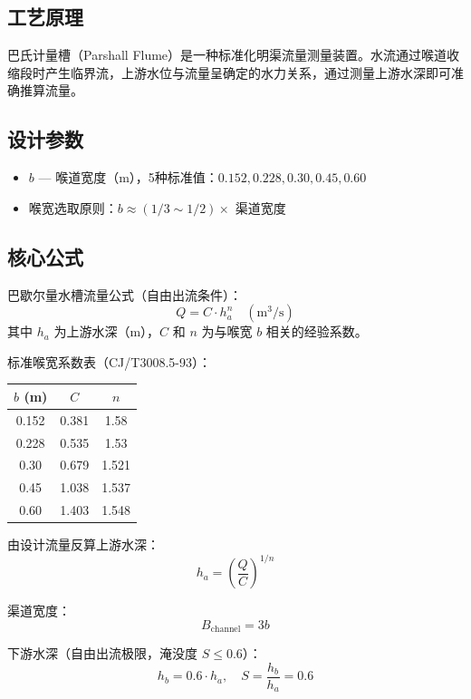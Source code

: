 \documentclass[12pt,a4paper]{ctexart}
\begin{document}
\subsection{工艺原理}
巴氏计量槽（Parshall Flume）是一种标准化明渠流量测量装置。水流通过喉道收缩段时产生临界流，上游水位与流量呈确定的水力关系，通过测量上游水深即可准确推算流量。

\subsection{设计参数}
\begin{itemize}
  \item $b$ — 喉道宽度（m），5种标准值：$0.152, 0.228, 0.30, 0.45, 0.60$
  \item 喉宽选取原则：$b \approx (1/3\sim1/2) \times$ 渠道宽度
\end{itemize}

\subsection{核心公式}
巴歇尔量水槽流量公式（自由出流条件）：
\begin{equation}
Q = C \cdot h_a^n \quad (\text{m}^3/\text{s})
\end{equation}
其中 $h_a$ 为上游水深（m），$C$ 和 $n$ 为与喉宽 $b$ 相关的经验系数。

标准喉宽系数表（CJ/T3008.5-93）：
\begin{center}
\begin{tabular}{c|c|c}
\toprule
$b$ (m) & $C$ & $n$ \\
\midrule
0.152 & 0.381 & 1.58 \\
0.228 & 0.535 & 1.53 \\
0.30  & 0.679 & 1.521 \\
0.45  & 1.038 & 1.537 \\
0.60  & 1.403 & 1.548 \\
\bottomrule
\end{tabular}
\end{center}

由设计流量反算上游水深：
\begin{equation}
h_a = \left(\frac{Q}{C}\right)^{1/n}
\end{equation}

渠道宽度：
\begin{equation}
B_{\text{channel}} = 3b
\end{equation}

下游水深（自由出流极限，淹没度 $S \le 0.6$）：
\begin{equation}
h_b = 0.6 \cdot h_a, \quad S = \frac{h_b}{h_a} = 0.6
\end{equation}
\end{document}
